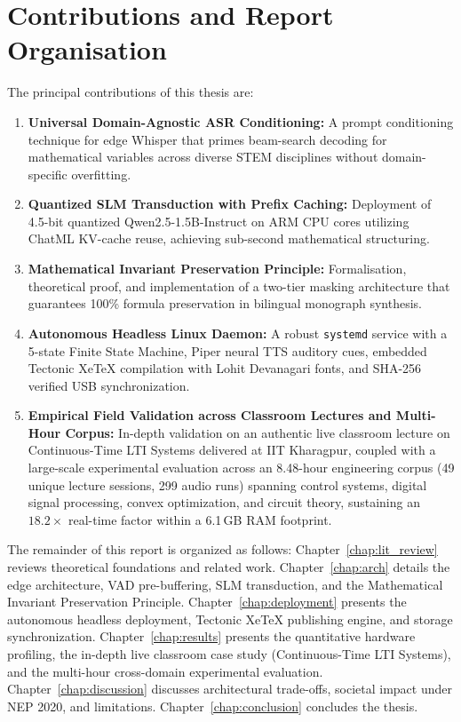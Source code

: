 \documentclass[11pt,a4paper,oneside]{report}
\begin{document}
\section{Contributions and Report Organisation}
The principal contributions of this thesis are:
\begin{enumerate}
    \item \textbf{Universal Domain-Agnostic ASR Conditioning:} A prompt conditioning technique for edge Whisper that primes beam-search decoding for mathematical variables across diverse STEM disciplines without domain-specific overfitting.
    \item \textbf{Quantized SLM Transduction with Prefix Caching:} Deployment of 4.5-bit quantized Qwen2.5-1.5B-Instruct on ARM CPU cores utilizing ChatML KV-cache reuse, achieving sub-second mathematical structuring.
    \item \textbf{Mathematical Invariant Preservation Principle:} Formalisation, theoretical proof, and implementation of a two-tier masking architecture that guarantees 100\% formula preservation in bilingual monograph synthesis.
    \item \textbf{Autonomous Headless Linux Daemon:} A robust \texttt{systemd} service with a 5-state Finite State Machine, Piper neural TTS auditory cues, embedded Tectonic XeTeX compilation with Lohit Devanagari fonts, and SHA-256 verified USB synchronization.
    \item \textbf{Empirical Field Validation across Classroom Lectures and Multi-Hour Corpus:} In-depth validation on an authentic live classroom lecture on Continuous-Time LTI Systems delivered at IIT Kharagpur, coupled with a large-scale experimental evaluation across an 8.48-hour engineering corpus (49 unique lecture sessions, 299 audio runs) spanning control systems, digital signal processing, convex optimization, and circuit theory, sustaining an $18.2\times$ real-time factor within a 6.1\,GB RAM footprint.
\end{enumerate}

The remainder of this report is organized as follows: Chapter~\ref{chap:lit_review} reviews theoretical foundations and related work. Chapter~\ref{chap:arch} details the edge architecture, VAD pre-buffering, SLM transduction, and the Mathematical Invariant Preservation Principle. Chapter~\ref{chap:deployment} presents the autonomous headless deployment, Tectonic XeTeX publishing engine, and storage synchronization. Chapter~\ref{chap:results} presents the quantitative hardware profiling, the in-depth live classroom case study (Continuous-Time LTI Systems), and the multi-hour cross-domain experimental evaluation. Chapter~\ref{chap:discussion} discusses architectural trade-offs, societal impact under NEP 2020, and limitations. Chapter~\ref{chap:conclusion} concludes the thesis.
\end{document}
